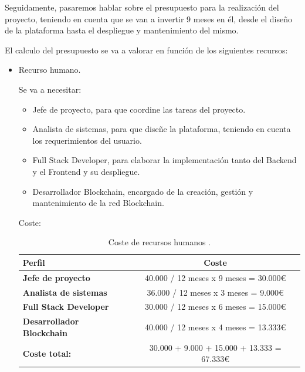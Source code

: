 Seguidamente, pasaremos hablar sobre el presupuesto para la realización del proyecto, teniendo en cuenta que se van a 
invertir 9 meses en él, desde el diseño de la plataforma hasta el despliegue y mantenimiento del mismo.

El calculo del presupuesto se va a valorar en función de los siguientes recursos:

\begin{itemize}
  \item Recurso humano.
  
  Se va a necesitar: 
  
  \begin{itemize}
    \item Jefe de proyecto, para que coordine las tareas del proyecto.
    \item Analista de sistemas, para que diseñe la plataforma, teniendo en cuenta los requerimientos del usuario.
    \item Full Stack Developer, para elaborar la implementación tanto del Backend y el Frontend y su despliegue.
    \item Desarrollador Blockchain, encargado de la creación, gestión y mantenimiento de la red Blockchain.
  \end{itemize}

  Coste:

  \begin{table}[h!]
    \centering
    \begin{tabular}{|l|c|}
        \hline
        \textbf{Perfil}                     &   \textbf{Coste} \\
        \hline 
        \hline
        \textbf{Jefe de proyecto}           &   40.000 / 12 meses x 9 meses = 30.000€ \\ 
        \hline 
        \textbf{Analista de sistemas}       &   36.000 / 12 meses x 3 meses = 9.000€ \\ 
        \hline
        \textbf{Full Stack Developer}       &   30.000 / 12 meses x 6 meses = 15.000€ \\ 
        \hline
        \textbf{Desarrollador Blockchain}   &   40.000 / 12 meses x 4 meses = 13.333€ \\ 
        \hline
        \textbf{Coste total:}               &   30.000 + 9.000 + 15.000 + 13.333 = 67.333€ \\ 
        \hline
    \end{tabular}
    
    \caption{Coste de recursos humanos \cite{info-jobs}.}
    \label{table:coste-recurso-humanos}
  \end{table}



\end{itemize}
